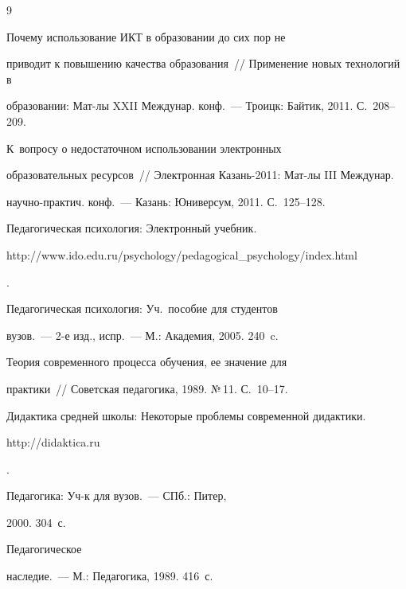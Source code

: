{\small\frenchspacing


{%




\begin{thebibliography}{9}







 Почему использование ИКТ в образовании до сих пор не 


приводит к повышению качества образования~/\!\!/ Применение новых технологий в 


образовании: Мат-лы XXII Междунар. конф.~--- Троицк: Байтик, 2011. С.~208--209.




 К~вопросу о недостаточном использовании электронных 


образовательных ресурсов~/\!\!/ Электронная Казань-2011: Мат-лы III Междунар. 


научно-прак\-тич. конф.~--- Казань: Юниверсум, 2011. С.~125--128.




 Педагогическая психология: Электронный учебник. {\sf 


http://\linebreak www.ido.edu.ru/psychology/pedagogical\_psychology/index.html}.




 Педагогическая психология: Уч.\ пособие для студентов 


вузов.~--- 2-е изд., испр.~--- М.: Академия, 2005. 240~c.




 Теория современного процесса обучения, ее значение для 


практики~/\!\!/ Советская педагогика, 1989. №\,11. С.~10--17.




Дидактика средней школы: Некоторые проблемы современной дидактики. {\sf 


http://\linebreak didaktica.ru}.




 Педагогика: Уч-к для вузов.~--- СПб.: Питер, 


2000. 304~с.





    \label{end\stat}




 Педагогическое 


наследие.~--- М.: Педагогика, 1989. 416~с.


 \end{thebibliography}


}


}


